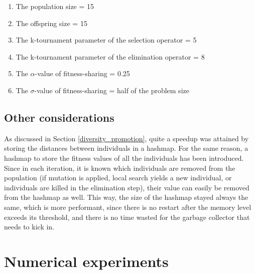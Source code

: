 \documentclass[a4paper,10pt]{article}
\newcommand{\ReplaceMe}[1]{{\color{blue}#1}}
\newcommand{\RemoveMe}[1]{{\color{purple}#1}}
\begin{document}
\begin{enumerate}
    \item The population size = 15
    \item The offspring size = 15
    \item The k-tournament parameter of the selection operator = 5 
    \item The k-tournament parameter of the elimination operator = 8
    \item The $\alpha$-value of fitness-sharing = 0.25
    \item The $\sigma$-value of fitness-sharing = half of the problem size
\end{enumerate}

\subsection{Other considerations}
As discussed in Section \ref{diversity_promotion}, quite a speedup was attained by storing the distances between individuals in a hashmap. For the same reason, a hashmap to store the fitness values of all the individuals has been introduced. Since in each iteration, it is known which individuals are removed from the population (if mutation is applied, local search yields a new individual, or individuals are killed in the elimination step), their value can easily be removed from the hashmap as well. This way, the size of the hashmap stayed always the same, which is more performant, since there is no restart after the memory level exceeds its threshold, and there is no time wasted for the garbage collector that needs to kick in.



\section{Numerical experiments}

\end{document}
